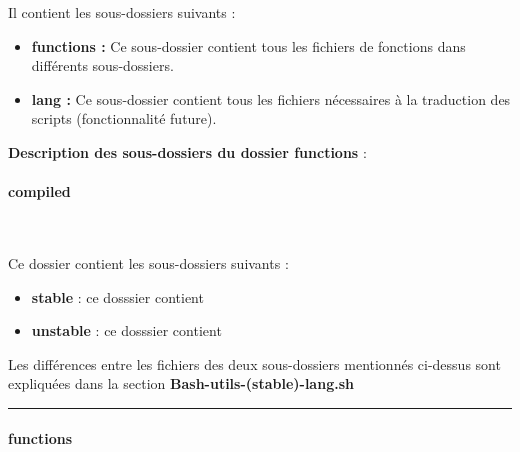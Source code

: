 \documentclass[a4paper,10pt]{article}
\begin{document}
    \begin{justify}
        Il contient les sous-dossiers suivants :

        \begin{itemize}
            \item \textbf{\color{path}functions\color{text} :} Ce sous-dossier contient tous les fichiers de fonctions dans différents sous-dossiers.\\\mbox{}

            \item \textbf{\color{path}lang\color{text} :} Ce sous-dossier contient tous les fichiers nécessaires à la traduction des scripts (fonctionnalité future).
        \end{itemize}
    \end{justify}


    \textbf{Description des sous-dossiers du dossier \textbf{functions}} :

    \setcounter{secnumdepth}{4}

    \paragraph{compiled}\mbox{}\\\mbox{}

    Ce dossier contient les sous-dossiers suivants :

    \begin{justify}
        \begin{itemize}
            \item \textbf{\color{path}stable} : ce dosssier contient\\\mbox{}

            \item \textbf{\color{path}unstable} : ce dosssier contient
        \end{itemize}
    \end{justify}

    \begin{justify}
        Les différences entre les fichiers des deux sous-dossiers mentionnés ci-dessus sont expliquées dans la section \textbf{\color{sec2}Bash-utils-(stable)-lang.sh\color{text}}
    \end{justify}

    \par\noindent\rule{\textwidth}{0.4pt}

    \paragraph{functions}\mbox{}\\\mbox{}
\end{document}

